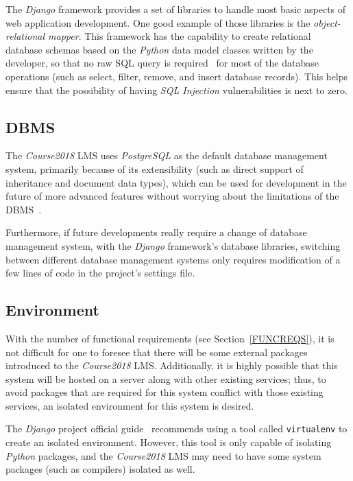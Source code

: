 The \emph{Django} framework provides a set of libraries to handle most basic
aspects of web application development. One good example of those libraries is
the \emph{object-relational mapper}. This framework has the capability to create
relational database schemas based on the \emph{Python} data model classes
written by the developer, so that no raw SQL query is required~\cite{django}
for most of the
database operations (such as select, filter, remove, and insert database
records).
This helps ensure that the possibility of having \emph{SQL Injection}
vulnerabilities is next to zero.

\subsection{DBMS}
The \emph{Course2018} LMS uses \emph{PostgreSQL} as the default database
management system, primarily because of its extensibility (such as direct
support of inheritance and document data types), which can be used for
development in the future of more advanced features without worrying about the
limitations of the DBMS~\cite{postgres}.

\medskip

Furthermore, if future developments really require a change of database
management system,
with the \emph{Django} framework's database libraries,
switching between different database management systems only requires
modification of a few lines of code in the project's settings file.

\subsection{Environment}
With the number of functional requirements (see Section~\ref{FUNCREQS}), it is not difficult for
one to foresee that there will be some external packages introduced to the
\emph{Course2018} LMS.
Additionally, it is highly possible that this system will be hosted
on a server along with other existing services; thus, to avoid packages that
are required for this system conflict with those existing services, an
isolated environment for this system is desired.

\medskip
The \emph{Django} project official guide~\cite{djangoGuide} recommends using
a tool called \texttt{virtualenv} to create an isolated environment. However,
this tool is only capable of isolating \emph{Python} packages, and the
\emph{Course2018} LMS may need to have some system packages (such as
compilers) isolated as well.

